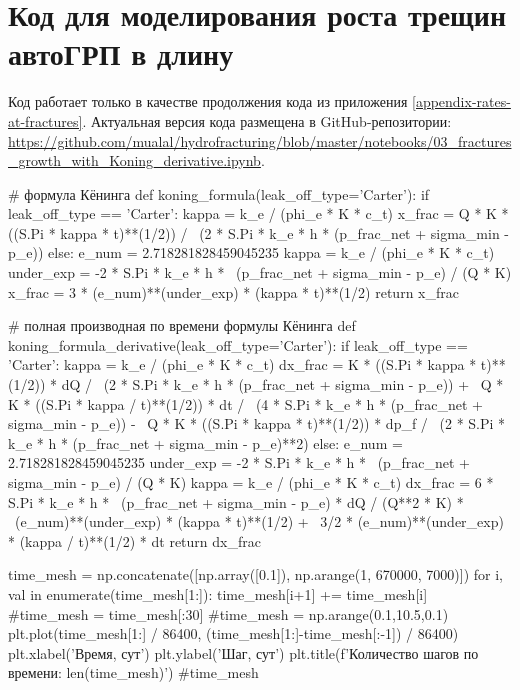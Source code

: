 \chapter{Код для моделирования роста трещин автоГРП в длину}\label{appendix-fractures-growth-modelling}
\vspace*{-10mm}

Код работает только в качестве продолжения кода из приложения \ref{appendix-rates-at-fractures}.
Актуальная версия кода размещена в GitHub-репозитории: \url{https://github.com/mualal/hydrofracturing/blob/master/notebooks/03_fractures_growth_with_Koning_derivative.ipynb}.

\begin{pythoncode}
# формула Кёнинга
def koning_formula(leak_off_type='Carter'):
    if leak_off_type == 'Carter':
        kappa = k_e / (phi_e * K * c_t)
        x_frac = Q * K * ((S.Pi * kappa * t)**(1/2)) / \
            (2 * S.Pi * k_e * h * (p_frac_net + sigma_min - p_e))
    else:
        e_num = 2.718281828459045235
        kappa = k_e / (phi_e * K * c_t)
        under_exp = -2 * S.Pi * k_e * h * \
            (p_frac_net + sigma_min - p_e) / (Q * K)
        x_frac = 3 * (e_num)**(under_exp) * (kappa * t)**(1/2)
    return x_frac

# полная производная по времени формулы Кёнинга
def koning_formula_derivative(leak_off_type='Carter'):
    if leak_off_type == 'Carter':
        kappa = k_e / (phi_e * K * c_t)
        dx_frac = K * ((S.Pi * kappa * t)**(1/2)) * dQ / \
            (2 * S.Pi * k_e * h * (p_frac_net + sigma_min - p_e)) + \
            Q * K * ((S.Pi * kappa / t)**(1/2)) * dt / \
                (4 * S.Pi * k_e * h * (p_frac_net + sigma_min - p_e)) - \
            Q * K * ((S.Pi * kappa * t)**(1/2)) * dp_f / \
                (2 * S.Pi * k_e * h * (p_frac_net + sigma_min - p_e)**2)
    else:
        e_num = 2.718281828459045235
        under_exp = -2 * S.Pi * k_e * h * \
            (p_frac_net + sigma_min - p_e) / (Q * K)
        kappa = k_e / (phi_e * K * c_t)
        dx_frac = 6 * S.Pi * k_e * h * \
            (p_frac_net + sigma_min - p_e) * dQ / (Q**2 * K) * \
                (e_num)**(under_exp) * (kappa * t)**(1/2) + \
                    3/2 * (e_num)**(under_exp) * (kappa / t)**(1/2) * dt
    return dx_frac
\end{pythoncode}


\begin{pythoncode}
time_mesh = np.concatenate([np.array([0.1]), np.arange(1, 670000, 7000)])
for i, val in enumerate(time_mesh[1:]):
    time_mesh[i+1] += time_mesh[i]
#time_mesh = time_mesh[:30]
#time_mesh = np.arange(0.1,10.5,0.1)
plt.plot(time_mesh[1:] / 86400, (time_mesh[1:]-time_mesh[:-1]) / 86400)
plt.xlabel('Время, сут')
plt.ylabel('Шаг, сут')
plt.title(f'Количество шагов по времени: {len(time_mesh)}')
#time_mesh
\end{pythoncode}


